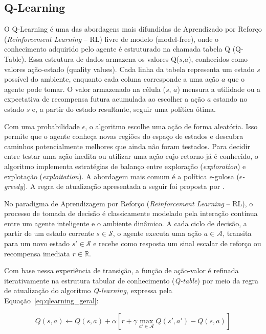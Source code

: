 \subsection{Q-Learning} O Q-Learning é uma das abordagens mais difundidas de Aprendizado por Reforço (\textit{Reinforcement Learning} -- RL) livre de modelo (model-free), onde o conhecimento adquirido pelo agente é estruturado na chamada tabela Q (Q-Table). Essa estrutura de dados armazena os valores Q($s$,$a$), conhecidos como valores ação-estado (quality values). Cada linha da tabela representa um estado $s$ possível do ambiente, enquanto cada coluna corresponde a uma ação $a$ que o agente pode tomar. O valor armazenado na célula ($s$, $a$) mensura a utilidade ou a expectativa de recompensa futura acumulada ao escolher a ação $a$ estando no estado $s$ e, a partir do estado resultante, seguir uma política ótima.

Com uma probabilidade $\epsilon$, o algoritmo escolhe uma ação de forma aleatória. Isso permite que o agente conheça novas regiões do espaço de estados e descubra caminhos potencialmente melhores que ainda não foram testados. Para decidir entre testar uma ação inedita ou utilizar uma ação cujo retorno já é conhecido, o algoritmo implementa estratégias de balanço entre exploração (\textit{exploration}) e explotação (\textit{exploitation}). A abordagem mais comum é a política $\epsilon$-gulosa (\textit{$\epsilon$-greedy}). A regra de atualização apresentada a seguir foi proposta por .

No paradigma de Aprendizagem por Reforço (\textit{Reinforcement Learning} -- RL), o processo de tomada de decisão é classicamente modelado pela interação contínua entre um agente inteligente e o ambiente dinâmico. A cada ciclo de decisão, a partir de um estado corrente $s \in \mathcal{S}$, o agente executa uma ação $a \in \mathcal{A}$, transita para um novo estado $s' \in \mathcal{S}$ e recebe como resposta um sinal escalar de reforço ou recompensa imediata $r \in \mathbb{R}$. 

Com base nessa experiência de transição, a função de ação-valor é refinada iterativamente na estrutura tabular de conhecimento (\textit{Q-table}) por meio da regra de atualização do algoritmo \textit{Q-learning}, expressa pela Equação~\eqref{eq:qlearning_geral}:

\begin{equation}
    Q(s, a) \leftarrow Q(s, a) + \alpha \left[ r + \gamma \max_{a' \in \mathcal{A}} Q(s', a') - Q(s, a) \right]
    \label{eq:qlearning_geral}
\end{equation}

